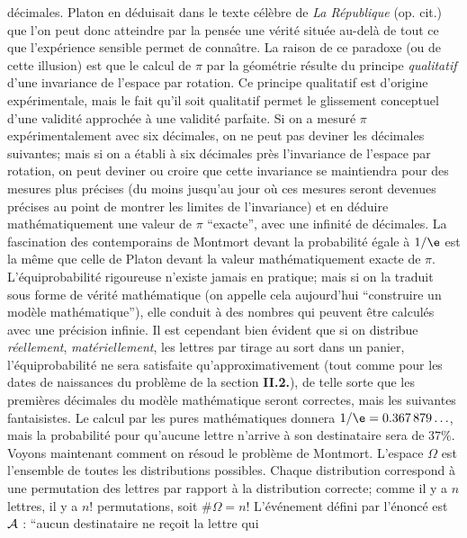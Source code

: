 d\'ecimales.  Platon en d\'eduisait dans le texte c\'el\`ebre de {\it La
R\'epublique} (op. cit.) que l'on peut donc atteindre par la pens\'ee une
v\'erit\'e situ\'ee au-del\`a de tout ce que l'exp\'erience sensible permet
de conna{\^\i}tre.  La raison de ce paradoxe (ou de cette illusion) est que le
calcul de $\pi$ par la g\'eom\'etrie r\'esulte du principe {\it qualitatif}
d'une invariance de l'espace par rotation.  Ce principe qualitatif est
d'origine exp\'erimentale,  mais le fait qu'il soit qualitatif permet le
glissement conceptuel d'une validit\'e approch\'ee \`a une validit\'e
parfaite.  Si on a mesur\'e $\pi$ exp\'erimentalement avec six 
d\'ecimales,  on ne peut pas deviner les d\'ecimales suivantes;  mais si on 
a \'etabli \`a six d\'ecimales pr\`es l'invariance de l'espace par rotation, 
on peut deviner ou croire que cette invariance se maintiendra pour des
mesures plus pr\'ecises (du moins jusqu'au jour o\`u ces mesures seront
devenues pr\'ecises au point de montrer les limites de l'invariance) et en
d\'eduire math\'ematiquement une valeur de $\pi$ ``exacte'',  avec une
infinit\'e de d\'ecimales.  
\medskip
La fascination des contemporains de Montmort devant la probabilit\'e 
\'egale \`a $1/\e$ est la m\^eme que celle de Platon devant la valeur
math\'e\-ma\-ti\-que\-ment exacte de $\pi$.  L'\'equiprobabilit\'e rigoureuse 
n'existe jamais en pratique;  mais si on la traduit sous forme de v\'erit\'e 
math\'ematique (on appelle cela aujourd'hui ``construire un mod\`ele 
math\'ematique''),  elle conduit \`a des nombres qui peuvent \^etre 
calcul\'es avec une pr\'ecision infinie.  Il est cependant bien \'evident 
que si on distribue {\it r\'eellement},  {\it mat\'eriellement},  les 
lettres par tirage au sort dans un panier,  l'\'equi\-pro\-ba\-bi\-lit\'e
ne  sera satisfaite qu'approximativement (tout comme pour les dates de
naissances du probl\`eme de la section {\bf II.2.}),  de telle sorte que  
les premi\`eres d\'ecimales du mod\`ele math\'ematique seront 
correctes,  mais les suivantes fantaisistes.  Le calcul par les pures 
math\'ematiques donnera $1/\e = 0.367\, 879 \ldots$,  mais la
probabilit\'e pour qu'aucune lettre n'arrive \`a son destinataire 
sera de
$37\%$.
\medskip
Voyons maintenant comment on r\'esoud le probl\`eme de Montmort. 
L'espace $\Omega$ est l'ensemble de toutes les distributions possibles.
Chaque distribution correspond \`a une permutation des lettres
par rapport \`a la distribution correcte; comme il y a $n$ lettres,  il y a
$n!$ permutations,  soit $\#\Omega=n!$ L'\'ev\'enement d\'efini par 
l'\'enonc\'e est ${\cal A}$ : ``aucun destinataire ne re\c{c}oit la lettre qui
